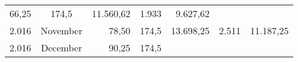 \documentclass[11pt,A4paper,]{article}
\begin{document}
\begin{longtable}[]{@{}rcrrrrr@{}}
\begin{minipage}[t]{0.09\columnwidth}
66,25\strut
\end{minipage} & \begin{minipage}[t]{0.09\columnwidth}\raggedleft\strut
174,5\strut
\end{minipage} & \begin{minipage}[t]{0.13\columnwidth}\raggedleft\strut
11.560,62\strut
\end{minipage} & \begin{minipage}[t]{0.09\columnwidth}\raggedleft\strut
1.933\strut
\end{minipage} & \begin{minipage}[t]{0.20\columnwidth}\raggedleft\strut
9.627,62\strut
\end{minipage}\tabularnewline
\begin{minipage}[t]{0.09\columnwidth}\raggedleft\strut
2.016\strut
\end{minipage} & \begin{minipage}[t]{0.13\columnwidth}\centering\strut
November\strut
\end{minipage} & \begin{minipage}[t]{0.09\columnwidth}\raggedleft\strut
78,50\strut
\end{minipage} & \begin{minipage}[t]{0.09\columnwidth}\raggedleft\strut
174,5\strut
\end{minipage} & \begin{minipage}[t]{0.13\columnwidth}\raggedleft\strut
13.698,25\strut
\end{minipage} & \begin{minipage}[t]{0.09\columnwidth}\raggedleft\strut
2.511\strut
\end{minipage} & \begin{minipage}[t]{0.20\columnwidth}\raggedleft\strut
11.187,25\strut
\end{minipage}\tabularnewline
\begin{minipage}[t]{0.09\columnwidth}\raggedleft\strut
2.016\strut
\end{minipage} & \begin{minipage}[t]{0.13\columnwidth}\centering\strut
December\strut
\end{minipage} & \begin{minipage}[t]{0.09\columnwidth}\raggedleft\strut
90,25\strut
\end{minipage} & \begin{minipage}[t]{0.09\columnwidth}\raggedleft\strut
174,5\strut
\end{minipage} & \begin{minipage}[t]{0.13\columnwidth}\raggedleft\strut

\end{minipage}
\end{longtable}
\end{document}
